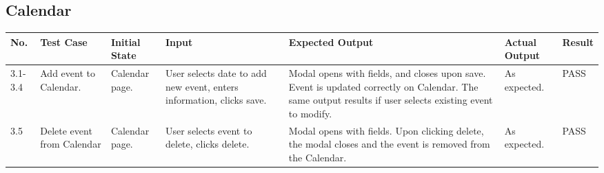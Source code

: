 \documentclass[12pt]{article}
\begin{document}

\subsection{Calendar}

\begin{longtable}{|p{1.5cm}|p{1.5cm}|p{1.5cm}|p{2cm}|p{4cm}|p{2cm}|p{1.5cm}|}
\hline
\textbf{No.} & \textbf{Test Case}  & \textbf{Initial State} & \textbf{Input} & \textbf{Expected Output} & \textbf{Actual Output} & \textbf{Result}\\ 
\hline
3.1-3.4 & Add event to Calendar. & Calendar page. & User selects date to add new event, enters information, clicks save. & Modal opens with fields, and closes upon save. Event is updated correctly on Calendar. The same output results if user selects existing event to modify. & As expected. & PASS \\
\hline
3.5 & Delete event from Calendar & Calendar page. & User selects  event to delete, clicks delete. & Modal opens with fields. Upon clicking delete, the modal closes and the event is removed from the Calendar. & As expected. & PASS \\
\hline
\end{longtable}
\end{document}
